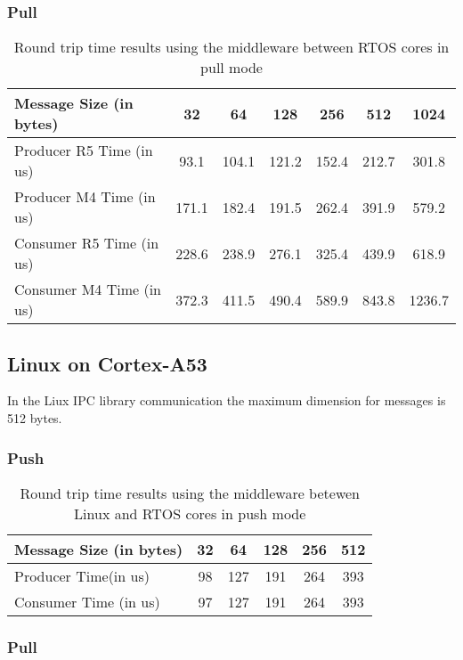 \subsubsection{Pull}

\begin{table}
\centering
\caption{Round trip time results using the middleware between RTOS cores in
         pull mode}
\label{table:broker_communication_RTOS_cores}
\begin{tabular}{lcccccc}
\toprule
Message Size (in bytes) & 32 & 64 & 128 & 256 & 512 & 1024 \\
\midrule
Producer R5 Time (in us) & 93.1 & 104.1 & 121.2 & 152.4 & 212.7 & 301.8 \\
Producer M4 Time (in us) & 171.1 & 182.4 & 191.5 & 262.4 & 391.9 & 579.2 \\
Consumer R5 Time (in us) & 228.6 & 238.9 & 276.1 & 325.4 & 439.9 & 618.9 \\
Consumer M4 Time (in us) & 372.3 & 411.5 & 490.4 & 589.9 & 843.8 & 1236.7 \\
\bottomrule
\end{tabular}
\end{table}

\subsection{Linux on Cortex-A53}

In the Liux IPC library communication the maximum dimension for messages is
512 bytes.

\subsubsection{Push}

\begin{table}
\centering
\caption{Round trip time results using the middleware betewen Linux and RTOS
    cores in push mode}
\label{table:broker_communication_linux_RTOS_cores_push}
\begin{tabular}{lccccc}
\toprule
Message Size (in bytes) & 32 & 64 & 128 & 256 & 512 \\
\midrule
Producer Time(in us) & 98 & 127 & 191 & 264 & 393 \\
Consumer Time (in us) & 97 & 127 & 191 & 264 & 393 \\
\bottomrule
\end{tabular}
\end{table}

\subsubsection{Pull}

